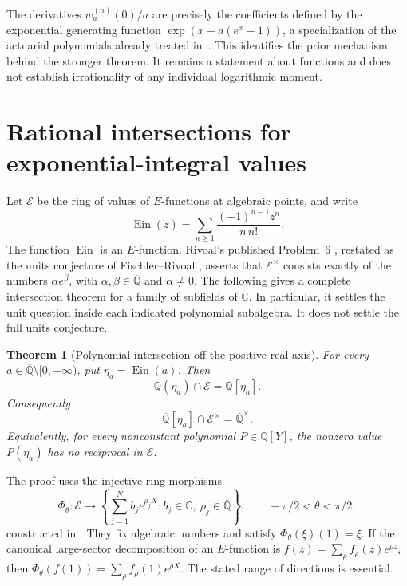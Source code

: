 \documentclass[11pt,a4paper]{article}
\newtheorem{theorem}{Theorem}[section]
\theoremstyle{definition}
\theoremstyle{remark}
\numberwithin{equation}{section}
\begin{document}
The derivatives $w_a^{(n)}(0)/a$ are precisely the coefficients
defined by the exponential generating function
$\exp(x-a(e^x-1))$, a specialization of the actuarial polynomials
already treated in~\cite[Table~2 and Corollary~4]{p3:BDR2024}.
This identifies the prior mechanism behind the stronger theorem.
It remains a statement about functions and does not establish
irrationality of any individual logarithmic moment.


\section{Rational intersections for exponential-integral values}
\label{p3:ef:section}

Let $\mathcal E$ be the ring of values of $E$-functions at algebraic
points, and write
\[
 \operatorname{Ein}(z)=\sum_{n\ge1}\frac{(-1)^{n-1}z^n}{n\,n!}.
\]
The function $\operatorname{Ein}$ is an $E$-function.  Rivoal's
published Problem~6 \cite[p.~286]{p3:RivoalXUPS2019}, restated as
the units conjecture of Fischler--Rivoal
\cite[Conjecture~1.2]{p3:FischlerRivoal2026Units},
asserts that $\mathcal E^\times$ consists exactly of the numbers
$\alpha e^\beta$, with $\alpha,\beta\in\overline{\mathbb Q}$ and
$\alpha\ne0$.  The following gives a complete intersection theorem
for a family of subfields of $\mathbb C$.  In particular, it settles
the unit question inside each indicated polynomial subalgebra.
It does not settle the full units conjecture.

\begin{theorem}[Polynomial intersection off the positive real axis]
\label{p3:ef:intersection}
For every $a\in\overline{\mathbb Q}\setminus[0,+\infty)$, put
$\eta_a=\operatorname{Ein}(a)$.  Then
\begin{equation}\label{p3:ef:intersection-equation}
 \overline{\mathbb Q}(\eta_a)\cap\mathcal E
 =\overline{\mathbb Q}[\eta_a].
\end{equation}
Consequently
\begin{equation}\label{p3:ef:units}
 \overline{\mathbb Q}[\eta_a]\cap\mathcal E^\times
 =\overline{\mathbb Q}^{\times}.
\end{equation}
Equivalently, for every nonconstant polynomial
$P\in\overline{\mathbb Q}[Y]$, the nonzero value $P(\eta_a)$ has
no reciprocal in $\mathcal E$.
\end{theorem}

The proof uses the injective ring morphisms
\[
 \Phi_\theta:\mathcal E\longrightarrow
 \left\{\sum_{j=1}^N b_j e^{\rho_jX}:
       b_j\in\mathbb C,\ \rho_j\in\overline{\mathbb Q}\right\},
 \qquad -\pi/2<\theta<\pi/2,
\]
constructed in \cite[Proposition~3.1]{p3:FischlerRivoal2026Units}.
They fix algebraic numbers and satisfy
$\Phi_\theta(\xi)(1)=\xi$.  If the canonical large-sector decomposition
of an $E$-function is $f(z)=\sum_\rho f_\rho(z)e^{\rho z}$,
then $\Phi_\theta(f(1))=\sum_\rho f_\rho(1)e^{\rho X}$.
The stated range of directions is essential.
\end{document}
